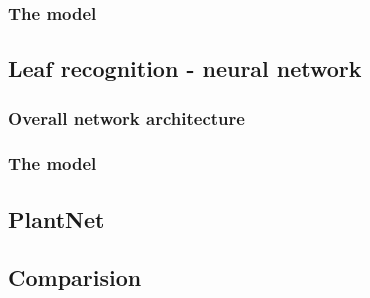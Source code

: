 \documentclass[../Main.tex]{subfiles}
\begin{document}
    \subsubsection{The model}
    
\subsection{Leaf recognition - neural network}
    \subsubsection{Overall network architecture}
    \subsubsection{The model}

\subsection{PlantNet}

\subsection{Comparision}
    
\newpage    
\biblio %
\end{document}
